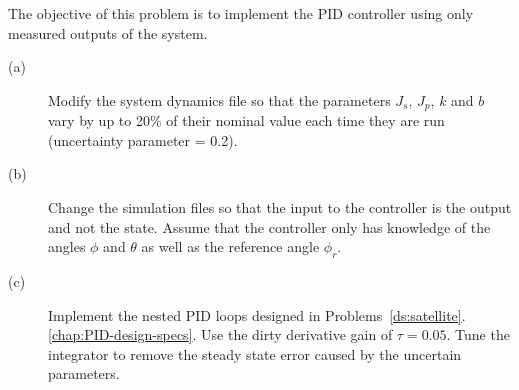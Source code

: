 The objective of this problem is to implement the PID controller using only measured outputs of the system.
\begin{description}
\item[(a)]  Modify the system dynamics file so that the parameters $J_s$, $J_p$, $k$ and $b$ vary by up to 20\% of their nominal value each time they are run (uncertainty parameter = 0.2).
\item[(b)]  Change the simulation files so that the input to the controller is the output and not the state.  Assume that the controller only has knowledge of the angles $\phi$ and $\theta$ as well as the reference angle $\phi_r$.
\item[(c)]  Implement the nested PID loops designed in Problems~\ref{ds:satellite}.\ref{chap:PID-design-specs}.   Use the dirty derivative gain of $\tau=0.05$. Tune the integrator to remove the steady state error caused by the uncertain parameters.
\end{description}